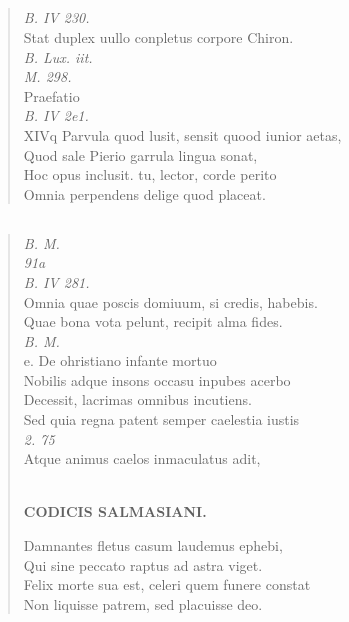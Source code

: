 \documentclass[11pt, a4paper]{report}
\begin{document}
            \subsection*{}
      \begin{verse}
      \textit{B. IV 230.} \\ Stat duplex uullo conpletus corpore Chiron. \\ \textit{B. Lux. iit.} \\ \textit{M. 298.} \\ Praefatio \\ \textit{B. IV 2e1.} \\  \lbrack XIVq Parvula quod lusit, sensit quood iunior aetas, \\ Quod sale Pierio garrula lingua sonat, \\ Hoc opus inclusit. tu, lector, corde perito \\ Omnia perpendens delige quod placeat. \\ 
      \end{verse}
  
            \subsection*{}
      \begin{verse}
      \textit{B. M.} \\ \textit{91a} \\ \textit{B. IV 281.} \\ Omnia quae poscis domiuum, si credis, habebis. \\ Quae bona vota pelunt, recipit alma fides. \\ \textit{B. M.} \\ e. De ohristiano infante mortuo \\ Nobilis adque insons occasu inpubes acerbo \\ Decessit, lacrimas omnibus incutiens. \\ Sed quia regna patent semper caelestia iustis \\ \textit{2. 75} \\ Atque animus caelos inmaculatus adit, \\ 
        ﻿\pagebreak 
    \begin{center} \textbf{CODICIS SALMASIANI.} \end{center} \marginpar{[123]} Damnantes fletus casum laudemus ephebi, \\ Qui sine peccato raptus ad astra viget. \\ Felix morte sua est, celeri quem funere constat \\ Non liquisse patrem, sed placuisse deo. \\ 
      \end{verse}
  
\end{document}
